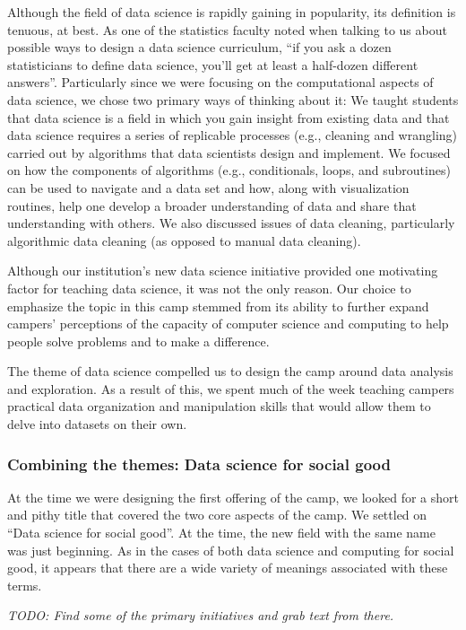 Although the field of data science is rapidly gaining in popularity,
its definition is tenuous, at best.  As one of the statistics faculty
noted when talking to us about possible ways to design a data science
curriculum, ``if you ask a dozen statisticians to define data
science, you'll get at least a half-dozen different answers''.
Particularly since we were focusing on the computational aspects
of data science, we chose two primary ways of thinking about it:
We taught students that data science is a field in which you gain
insight from existing data and that data science requires a series
of replicable processes (e.g., cleaning and wrangling) carried out
by algorithms that data scientists design and implement.  We focused
on how the components of algorithms (e.g., conditionals,  loops,
and subroutines) can be used to navigate and a data set and how,
along with visualization routines, help one develop a broader understanding
of data and share that understanding with others.  We also discussed issues
of data cleaning, particularly algorithmic data cleaning (as opposed to
manual data cleaning).

Although our institution's new data science initiative provided one
motivating factor for teaching data science, it was not the only
reason.  Our choice to emphasize the topic in this camp stemmed
from its ability to further expand campers' perceptions of the
capacity of computer science and computing to help people solve problems
and to make a difference.

The theme of data science compelled us to design the camp around
data analysis and exploration. As a result of this, we spent much
of the week teaching campers practical data organization and
manipulation skills that would allow them to delve into datasets
on their own.

\subsubsection{Combining the themes: Data science for social good}

At the time we were designing the first offering of the camp, we looked
for a short and pithy title that covered the two core aspects of the camp.
We settled on ``Data science for social good''.  At the time, the
new field with the same name was just beginning.  As in the cases of
both data science and computing for social good, it appears that there
are a wide variety of meanings associated with these terms.

\textit{TODO: Find some of the primary initiatives and grab 
text from there.}

